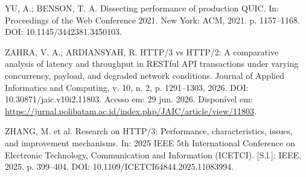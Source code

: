 YU, A.; BENSON, T. A. Dissecting performance of production QUIC. In: Proceedings of the Web Conference 2021. New York: ACM, 2021. p. 1157--1168. DOI: 10.1145/3442381.3450103.



ZAHRA, V. A.; ARDIANSYAH, R. HTTP/3 vs HTTP/2: A comparative analysis of latency and throughput in RESTful API transactions under varying concurrency, payload, and degraded network conditions. Journal of Applied Informatics and Computing, v. 10, n. 2, p. 1291--1303, 2026. DOI: 10.30871/jaic.v10i2.11803. Acesso em: 29 jun. 2026. Disponível em: \url{https://jurnal.polibatam.ac.id/index.php/JAIC/article/view/11803}.



ZHANG, M. et al. Research on HTTP/3: Performance, characteristics, issues, and improvement mechanisms. In: 2025 IEEE 5th International Conference on Electronic Technology, Communication and Information (ICETCI). [S.l.]: IEEE, 2025. p. 399--404. DOI: 10.1109/ICETCI64844.2025.11083994.
